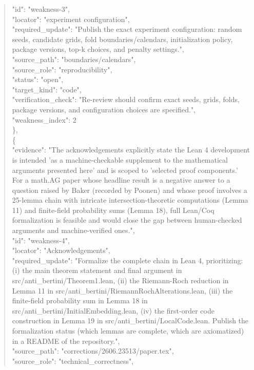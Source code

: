 \documentclass[11pt]{article}
\begin{document}
\begin{quote}
      "id": "weakness-3",\\
      "locator": "experiment configuration",\\
      "required\_update": "Publish the exact experiment configuration: random seeds, candidate grids, fold boundaries/calendars, initialization policy, package versions, top-k choices, and penalty settings.",\\
      "source\_path": "boundaries/calendars",\\
      "source\_role": "reproducibility",\\
      "status": "open",\\
      "target\_kind": "code",\\
      "verification\_check": "Re-review should confirm exact seeds, grids, folds, package versions, and configuration choices are specified.",\\
      "weakness\_index": 2\\
    \},\\
    \{\\
      "evidence": "The acknowledgements explicitly state the Lean 4 development is intended 'as a machine-checkable supplement to the mathematical arguments presented here' and is scoped to 'selected proof components.' For a math.AG paper whose headline result is a negative answer to a question raised by Baker (recorded by Poonen) and whose proof involves a 25-lemma chain with intricate intersection-theoretic computations (Lemma 11) and finite-field probability sums (Lemma 18), full Lean/Coq formalization is feasible and would close the gap between human-checked arguments and machine-verified ones.",\\
      "id": "weakness-4",\\
      "locator": "Acknowledgements",\\
      "required\_update": "Formalize the complete chain in Lean 4, prioritizing: (i) the main theorem statement and final argument in src/anti\_bertini/Theorem1.lean, (ii) the Riemann-Roch reduction in Lemma 11 in src/anti\_bertini/RiemannRochAlterations.lean, (iii) the finite-field probability sum in Lemma 18 in src/anti\_bertini/InitialEmbedding.lean, (iv) the first-order code construction in Lemma 19 in src/anti\_bertini/LocalCode.lean. Publish the formalization status (which lemmas are complete, which are axiomatized) in a README of the repository.",\\
      "source\_path": "corrections/2606.23513/paper.tex",\\
      "source\_role": "technical\_correctness",\\

\end{quote}
\end{document}
